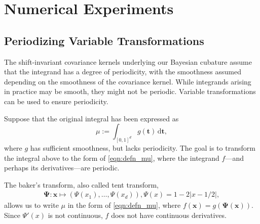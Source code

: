 \documentclass{svjour3}                     %
\newcommand{\bm}[1]{\boldsymbol{#1}}
\newcommand{\dif}[1]{\text{d}{#1}}
\newcommand{\vt}{\bm{t}}
\newcommand{\vx}{\bm{x}}
\newcommand{\vPsi}{\boldsymbol{\Psi}}
\def\abs#1{\ensuremath{\left \lvert #1 \right \rvert}}
\begin{document}
\section{Numerical Experiments} \label{sec:NumExp}

\subsection{Periodizing Variable Transformations}
\label{period_var_tx}
The shift-invariant covariance kernels underlying our Bayesian cubature  assume that the integrand has a degree of periodicity, with the smoothness assumed depending on the smoothness of the covariance kernel.  While integrands arising in practice may be smooth, they might not be periodic.  Variable transformations can be used to ensure periodicity.

Suppose that the original integral has been expressed as 
\begin{equation*}
\mu := \int_{[0,1]^d} g(\vt) \, \dif \vt,
\end{equation*}
where $g$ has sufficient smoothness, but lacks periodicity.  
The goal is to transform the integral above to the form of \eqref{eqn:defn_mu}, where the integrand $f$---and perhaps its derivatives---are  periodic.  

The baker's transform, also called tent transform,
\begin{align} \label{eq:bakerTrans}
\vPsi: \vx \mapsto (\Psi(x_1),  \ldots, \Psi(x_d)),  \Psi(x)  =1 - 2 \abs{x - 1/2},
\end{align}
allows us to write $\mu$ in the form of \eqref{eqn:defn_mu}, where $f(\vx) = g(\vPsi(\vx))$.  Since  $\Psi'(x)$ is not continuous, $f$ does not have continuous derivatives. 
\end{document}
